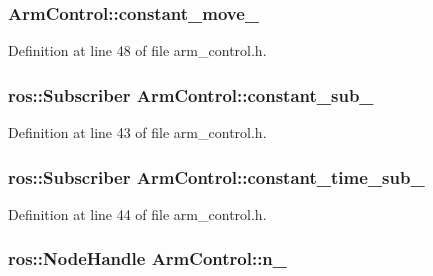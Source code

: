 \subsubsection[{constant\-\_\-move\-\_\-}]{ {\bf \-Arm\-Control\-::constant\-\_\-move\-\_\-}\hspace{0.3cm}{\ttfamily  [private]}}\label{classArmControl_a891d406c9be6c6e3801a2e392364fcd1}


\-Definition at line 48 of file arm\-\_\-control.\-h.

\subsubsection[{constant\-\_\-sub\-\_\-}]{\setlength{\rightskip}{0pt plus 5cm}ros\-::\-Subscriber {\bf \-Arm\-Control\-::constant\-\_\-sub\-\_\-}\hspace{0.3cm}{\ttfamily  [private]}}\label{classArmControl_a51f82f2c94949fc24393d496dc41f16b}


\-Definition at line 43 of file arm\-\_\-control.\-h.

\subsubsection[{constant\-\_\-time\-\_\-sub\-\_\-}]{\setlength{\rightskip}{0pt plus 5cm}ros\-::\-Subscriber {\bf \-Arm\-Control\-::constant\-\_\-time\-\_\-sub\-\_\-}\hspace{0.3cm}{\ttfamily  [private]}}\label{classArmControl_abb25af1f32fb8fec007972182d54d7d1}


\-Definition at line 44 of file arm\-\_\-control.\-h.

\subsubsection[{n\-\_\-}]{\setlength{\rightskip}{0pt plus 5cm}ros\-::\-Node\-Handle {\bf \-Arm\-Control\-::n\-\_\-}\hspace{0.3cm}{\ttfamily  [private]}}\label{classArmControl_ac7aac224c9d677c0ae7fe94de9d8f5ce}



